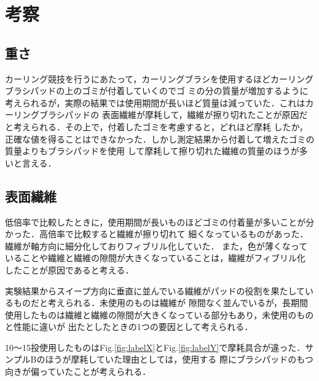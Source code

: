\documentclass[main]{subfiles}
\begin{document}
\chapter{考察}
\section{重さ}
カーリング競技を行うにあたって，カーリングブラシを使用するほどカーリングブラシパッドの上のゴミが付着していくのでゴ
ミの分の質量が増加するように考えられるが，実際の結果では使用期間が長いほど質量は減っていた．これはカーリングブラシパッドの
表面繊維が摩耗して，繊維が擦り切れたことが原因だと考えられる．その上で，付着したゴミを考慮すると，どれほど摩耗
したか，正確な値を得ることはできなかった．しかし測定結果から付着して増えたゴミの質量よりもブラシパッドを使用
して摩耗して擦り切れた繊維の質量のほうが多いと言える．
\\

\section{表面繊維}
低倍率で比較したときに，使用期間が長いものほどゴミの付着量が多いことが分かった．高倍率で比較すると繊維が擦り切れて
細くなっているものがあった．繊維が軸方向に細分化しておりフィブリル化していた．
また，色が薄くなっていることや繊維と繊維の隙間が大きくなっていることは，繊維がフィブリル化
したことが原因であると考える．

実験結果からスイープ方向に垂直に並んでいる繊維がパッドの役割を果たしているものだと考えられる．未使用のものは繊維が
隙間なく並んでいるが，長期間使用したものは繊維と繊維の隙間が大きくなっている部分もあり，未使用のものと性能に違いが
出たとしたときの1つの要因として考えられる．

10～15投使用したものはFig.\ref{fig:labelX}とFig.\ref{fig:labelY}で摩耗具合が違った．サンプルBのほうが摩耗していた理由としては，使用する
際にブラシパッドのもつ向きが偏っていたことが考えられる．
\end{document}
